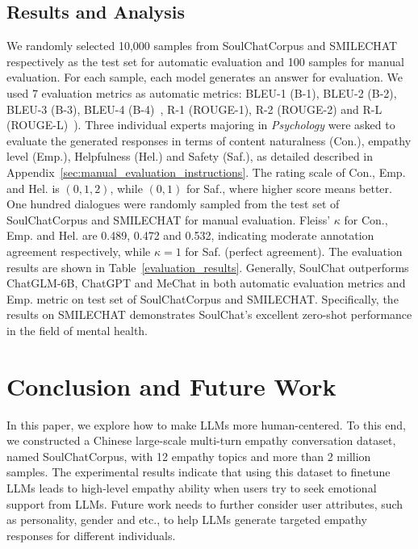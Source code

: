 \documentclass[11pt]{article}
\begin{document}
\subsection{Results and Analysis}
We randomly selected 10,000 samples from SoulChatCorpus and SMILECHAT respectively as the test set for automatic evaluation and 100 samples for manual evaluation. For each sample, each model generates an answer for evaluation. We used 7 evaluation metrics as automatic metrics: BLEU-1 (B-1), BLEU-2 (B-2), BLEU-3 (B-3), BLEU-4 (B-4)~\citep{papineni-etal-2002-bleu}, R-1 (ROUGE-1), R-2 (ROUGE-2) and R-L (ROUGE-L)~\citep{lin-2004-rouge}). Three individual experts majoring in \textit{Psychology} were asked to evaluate the generated responses in terms of content naturalness (Con.), empathy level (Emp.), Helpfulness (Hel.) and Safety (Saf.), as detailed described in Appendix~\ref{sec:manual_evaluation_instructions}. The rating scale of Con., Emp. and Hel. is $(0, 1, 2)$, while $(0, 1)$ for Saf., where higher score means better. One hundred dialogues were randomly sampled from the test set of SoulChatCorpus and SMILECHAT for manual evaluation. Fleiss' $\kappa$ \cite{fleiss1971measuring} for Con., Emp. and Hel. are 0.489, 0.472 and 0.532, indicating moderate annotation agreement respectively, while $\kappa=1$ for Saf. (perfect agreement). The evaluation results are shown in Table~\ref{evaluation_results}. Generally, SoulChat outperforms ChatGLM-6B, ChatGPT and MeChat in both automatic evaluation metrics and Emp. metric on test set of SoulChatCorpus and SMILECHAT. Specifically, the results on SMILECHAT demonstrates SoulChat's excellent zero-shot performance in the field of mental health.


\section{Conclusion and Future Work}
\label{sec:conclusion}
In this paper, we explore how to make LLMs more human-centered. To this end, we constructed a Chinese large-scale multi-turn empathy conversation dataset, named SoulChatCorpus, with 12 empathy topics and more than 2 million samples. The experimental results indicate that using this dataset to finetune LLMs leads to high-level empathy ability when users try to seek emotional support from LLMs. Future work needs to further consider user attributes, such as personality, gender and etc., to help LLMs generate targeted empathy responses for different individuals.
\end{document}
